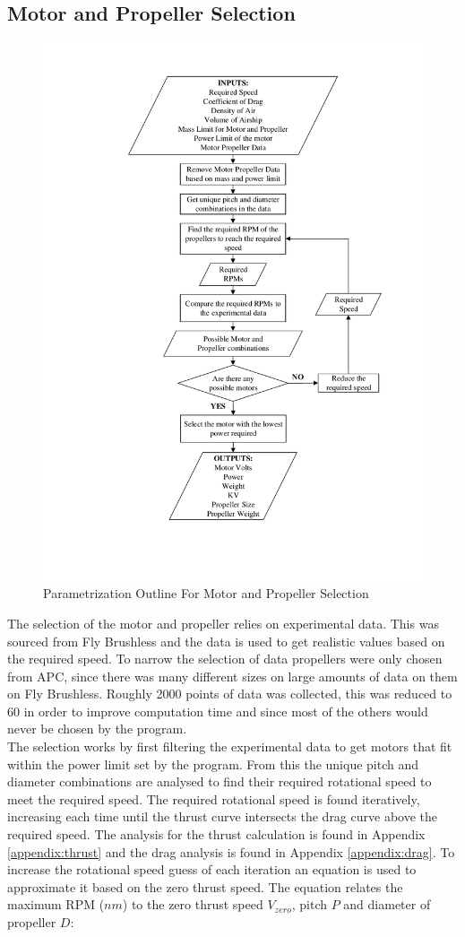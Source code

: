 \documentclass[../main.tex]{subfiles}
\begin{document}
\subsection{Motor and Propeller Selection} \label{motorSelect}

\begin{figure}[H]
	\centering
	\includegraphics[width=0.7\linewidth]{img/paramaterization/motorPropellerChoice.pdf}
	\caption{Parametrization Outline For Motor and Propeller Selection}
	\label{fig:motorOutline}
\end{figure}

The selection of the motor and propeller relies on experimental data. This was sourced from Fly Brushless \cite{propMotData} and the data is used to get realistic values based on the required speed. To narrow the selection of data propellers were only chosen from APC, since there was many different sizes on large amounts of data on them on Fly Brushless. Roughly 2000 points of data was collected, this was reduced to 60 in order to improve computation time and since most of the others would never be chosen by the program.\\

The selection works by first filtering the experimental data to get motors that fit within the power limit set by the program. From this the unique pitch and diameter combinations are analysed to find their required rotational speed to meet the required speed. The required rotational speed is found iteratively, increasing each time until the thrust curve intersects the drag curve above the required speed. The analysis for the thrust calculation is found in Appendix \ref{appendix:thrust} and the drag analysis is found in Appendix \ref{appendix:drag}. To increase the rotational speed guess of each iteration an equation is used to approximate it based on the zero thrust speed. The equation relates the maximum RPM ($nm$) to the zero thrust speed $V_{zero}$, pitch $P$ and diameter of propeller $D$:
\end{document}
